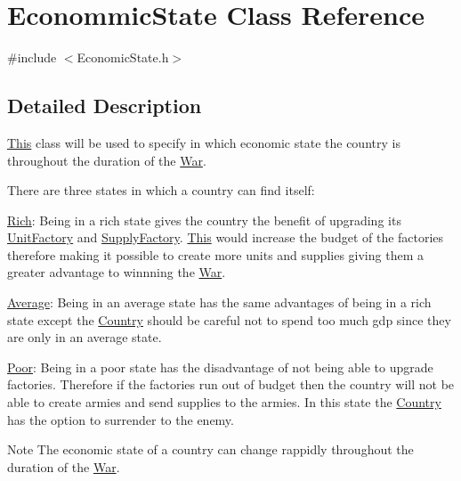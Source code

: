 \hypertarget{class_econommic_state}{}\section{Econommic\+State Class Reference}
\label{class_econommic_state}


{\ttfamily \#include $<$Economic\+State.\+h$>$}



\subsection{Detailed Description}
\mbox{\hyperlink{class_this}{This}} class will be used to specify in which economic state the country is throughout the duration of the \mbox{\hyperlink{class_war}{War}}.

There are three states in which a country can find itself\+:
\begin{DoxyItemize}
\item \mbox{\hyperlink{class_rich}{Rich}}\+: Being in a rich state gives the country the benefit of upgrading its \mbox{\hyperlink{class_unit_factory}{Unit\+Factory}} and \mbox{\hyperlink{class_supply_factory}{Supply\+Factory}}. \mbox{\hyperlink{class_this}{This}} would increase the budget of the factories therefore making it possible to create more units and supplies giving them a greater advantage to winnning the \mbox{\hyperlink{class_war}{War}}.
\item \mbox{\hyperlink{class_average}{Average}}\+: Being in an average state has the same advantages of being in a rich state except the \mbox{\hyperlink{class_country}{Country}} should be careful not to spend too much gdp since they are only in an average state.
\item \mbox{\hyperlink{class_poor}{Poor}}\+: Being in a poor state has the disadvantage of not being able to upgrade factories. Therefore if the factories run out of budget then the country will not be able to create armies and send supplies to the armies. In this state the \mbox{\hyperlink{class_country}{Country}} has the option to surrender to the enemy.
\end{DoxyItemize}

\begin{DoxyNote}{Note}
The economic state of a country can change rappidly throughout the duration of the \mbox{\hyperlink{class_war}{War}}. 
\end{DoxyNote}

